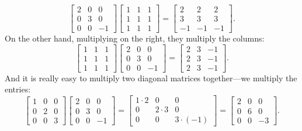 \begin{equation*}
\begin{bmatrix}
2 & 0 & 0 \\
0 & 3 & 0 \\
0 & 0 & -1
\end{bmatrix}
\begin{bmatrix}
1 & 1 & 1 \\
1 & 1 & 1 \\
1 & 1 & 1 
\end{bmatrix}
=
\begin{bmatrix}
2 & 2 & 2 \\
3 & 3 & 3 \\
-1 & -1 & -1 
\end{bmatrix} .
\end{equation*}
On the other hand, multiplying on the right, they multiply the columns:
\begin{equation*}
\begin{bmatrix}
1 & 1 & 1 \\
1 & 1 & 1 \\
1 & 1 & 1 
\end{bmatrix}
\begin{bmatrix}
2 & 0 & 0 \\
0 & 3 & 0 \\
0 & 0 & -1
\end{bmatrix}
=
\begin{bmatrix}
2 & 3 & -1 \\
2 & 3 & -1 \\
2 & 3 & -1 
\end{bmatrix} .
\end{equation*}
And it is really easy to multiply two diagonal matrices together---we
multiply the entries:
\begin{equation*}
\begin{bmatrix}
1 & 0 & 0 \\
0 & 2 & 0 \\
0 & 0 & 3 
\end{bmatrix}
\begin{bmatrix}
2 & 0 & 0 \\
0 & 3 & 0 \\
0 & 0 & -1
\end{bmatrix}
=
\begin{bmatrix}
1 \cdot 2 & 0 & 0 \\
0 & 2 \cdot 3 & 0 \\
0 & 0 & 3 \cdot (-1) 
\end{bmatrix}
=
\begin{bmatrix}
2 & 0 & 0 \\
0 & 6 & 0 \\
0 & 0 & -3 
\end{bmatrix} .
\end{equation*}

